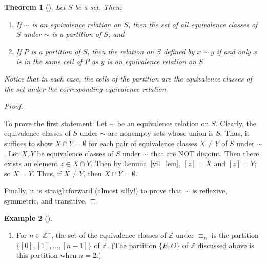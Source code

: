 \documentclass[10pt,]{book}
\theoremstyle{plain}
\newtheorem{theorem}{Theorem}[section]
\theoremstyle{definition}
\theoremstyle{definition}
\theoremstyle{definition}
\newtheorem{example}[theorem]{Example}
\theoremstyle{definition}
\numberwithin{equation}{section}
\def\Z{\mathbb{Z}}
\begin{document}
\begin{theorem}[{}]\label{part_quiv}
Let \(S\) be a set. Then: \leavevmode%
\begin{enumerate}
\item\hypertarget{li-397}{}If \(\sim\) is an equivalence relation on \(S\), then the set of all equivalence classes of \(S\) under \(\sim\) is a partition of \(S\); and%
\item\hypertarget{li-398}{}If \(P\) is a partition of \(S\), then the relation on \(S\) defined by \(x\sim y\) if and only \(x\) is in the same cell of \(P\) as \(y\) is an equivalence relation on \(S\).%
\end{enumerate}
%
\par
Notice that in each case, the cells of the partition are the equivalence classes of the set under the corresponding equivalence relation.%
\end{theorem}
\begin{proof}\hypertarget{proof-36}{}
To prove the first statement: Let \(\sim\) be an equivalence relation on \(S\). Clearly, the equivalence classes of \(S\) under \(\sim\) are nonempty sets whose union is \(S\). Thus, it suffices to show \(X
\cap Y =\emptyset\) for each pair of equivalence classes \(X\neq
Y\) of \(S\) under \(\sim\). Let \(X,Y\) be equivalence classes of \(S\) under \(\sim\) that are NOT disjoint. Then there exists an element \(z\in X\cap Y\). Then by \hyperref[vil_lem]{Lemma~\ref{vil_lem}}, \([z]=X\) and \([z]=Y\); so \(X=Y\). Thus, if \(X\neq Y\), then \(X\cap Y
=\emptyset\).%
\par
Finally, it is straightforward (almost silly!) to prove that \(\sim\) is reflexive, symmetric, and transitive.%
\end{proof}
\begin{example}[]\label{example-67}
\leavevmode%
\begin{enumerate}
\item\hypertarget{li-399}{}For \(n\in \Z^+\), the set of the equivalence classes of \(\Z\) under \(\equiv_n\) is the partition \(\{[0],[1],\ldots,[n-1]\}\) of \(\Z\). (The partition \(\{E
,O\}\) of \(\Z\) discussed above is this partition when \(n=2\).)%
\end{enumerate}
\end{example}
\typeout{************************************************}
\typeout{************************************************}
\end{document}
